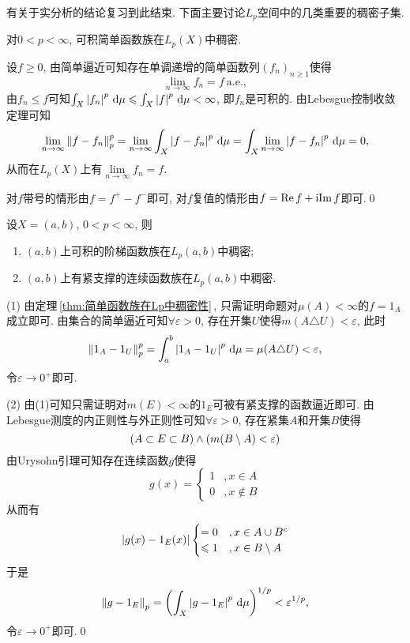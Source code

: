     有关于实分析的结论复习到此结束. 下面主要讨论$ L_p $空间中的几类重要的稠密子集.

    \begin{Theorem}\label{thm:简单函数族在Lp中稠密性}
    对$ 0<p<\infty $, 可积简单函数族在$ L_p(X) $中稠密.
    \end{Theorem}
    \begin{Proof}
    设$ f\geqslant 0 $, 由简单逼近可知存在单调递增的简单函数列$ (f_n)_{n\geqslant 1} $使得
    \[
    \lim_{n\to\infty}f_n=f\ \text{a.e.},
    \]
    由$ f_n\leqslant f $可知$ \int_X\left| f_n \right| ^p\,\mathrm{d}\mu\leqslant\int_X\left| f \right| ^p\,\mathrm{d}\mu<\infty $, 即$ f_n $是可积的. 由Lebesgue控制收敛定理可知
    \[
    \lim_{n\to\infty}\left\| f-f_n \right\|_p^p=\lim_{n\to\infty}\int_X\left| f-f_n \right| ^p\,\mathrm{d}\mu=\int_X\lim_{n\to\infty}\left| f-f_n \right| ^p\,\mathrm{d}\mu=0,
    \]
    从而在$ L_p(X) $上有$ \lim\limits_{n\to\infty}f_n=f $.

    对$ f $带号的情形由$ f=f^+-f^- $即可, 对$ f $复值的情形由$ f=\mathrm{Re\,} f+\mathrm{i}\mathrm{Im\,} f $即可.\qed
    \end{Proof}

    \begin{Corollary}
    设$ X=(a,b) $, $ 0<p<\infty $, 则
    \begin{enumerate}[(1)]
    \item $ (a,b) $上可积的阶梯函数族在$ L_p(a,b) $中稠密;
    \item $ (a,b) $上有紧支撑的连续函数族在$ L_p(a,b) $中稠密.
    \end{enumerate}
    \end{Corollary}
    \begin{Proof}
    (1) 由定理\,\ref{thm:简单函数族在Lp中稠密性}\,, 只需证明命题对$ \mu(A)<\infty $的$ f=1_A $成立即可. 由集合的简单逼近可知$ \forall\varepsilon>0 $, 存在开集$ U $使得$ m(A\triangle U)<\varepsilon $, 此时
    \[
    \left\| 1_A-1_U \right\|_p^p=\int_a^b\left| 1_A-1_U \right| ^p\,\mathrm{d}\mu=\mu(A\triangle U)<\varepsilon,
    \]
    令$ \varepsilon\to 0^+ $即可.

    (2) 由(1)可知只需证明对$ m(E)<\infty $的$ 1_E $可被有紧支撑的函数逼近即可. 由Lebesgue测度的内正则性与外正则性可知$ \forall\varepsilon>0 $, 存在紧集$ A $和开集$ B $使得
    \[
    (A\subset E\subset B)\land(m(B\setminus A)<\varepsilon)
    \]
    由Urysohn引理可知存在连续函数$ g $使得
    \[
    g(x)=\begin{cases}
    1 & ,x\in A\\0 & ,x\notin B
    \end{cases}
    \]
    从而有
    \[
    \left| g(x)-1_E(x) \right| \begin{cases}
    =0 & ,x\in A\cup B^c\\\leqslant 1 & ,x\in B\setminus A
    \end{cases}
    \]
    于是
    \[
    \left\| g-1_E \right\|_p=\left(\int_X\left| g-1_E \right| ^p\,\mathrm{d}\mu\right)^{1/p}<\varepsilon^{1/p},
    \]
    令$ \varepsilon\to 0^+ $即可.\qed
    \end{Proof}

